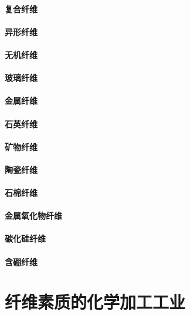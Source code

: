 \documentclass[UTF8]{../../ApplicationUniverse}
\begin{document}
        \subsubsection{复合纤维}
        \subsubsection{异形纤维}
\subsubsection{无机纤维}
    \subsubsection{玻璃纤维}
    \subsubsection{金属纤维}
    \subsubsection{石英纤维}
    \subsubsection{矿物纤维}
        \subsubsection{陶瓷纤维}
        \subsubsection{石棉纤维}
    \subsubsection{金属氧化物纤维}
    \subsubsection{碳化硅纤维}
    \subsubsection{含硼纤维}







\chapter{纤维素质的化学加工工业}
\end{document}
